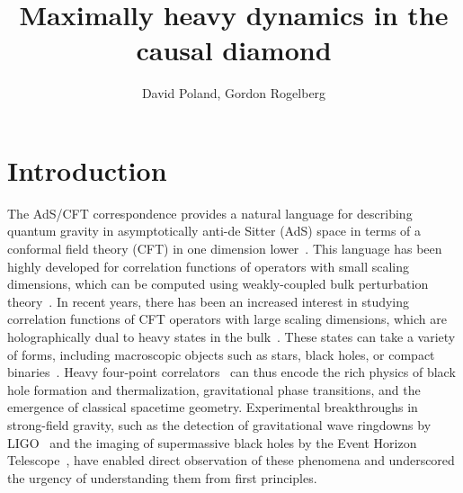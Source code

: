 \documentclass[a4paper,11pt]{article}
\title{Maximally heavy dynamics in the causal diamond}
\author{David Poland, Gordon Rogelberg}
\affiliation{Department of Physics, Yale University, 217 Prospect St, New Haven, CT 06520, USA}
\theoremstyle{plain}
\theoremstyle{definition}
\theoremstyle{remark}
\begin{document}
\maketitle

\setcounter{page}{2}
\newpage
{}
\setcounter{page}{1}

\section{Introduction}

The AdS/CFT correspondence provides a natural language for describing quantum gravity in asymptotically anti-de Sitter (AdS) space in terms of a conformal field theory (CFT) in one dimension lower~\cite{Maldacena:1997re,Gubser:1998bc,Witten:1998qj}. This language has been highly developed for correlation functions of operators with small scaling dimensions, which can be computed using weakly-coupled bulk perturbation theory~\cite{Arutyunov:2003ad,Chicherin_2016,Chicherin:2018avq}. In recent years, there has been an increased interest in studying correlation functions of CFT operators with large scaling dimensions, which are holographically dual to heavy states in the bulk~\cite{Fitzpatrick:2015zha,Asplund:2014coa,Collier:2019weq}. These states can take a variety of forms, including macroscopic objects such as stars, black holes, or compact binaries~\cite{Horowitz:2000fm,Hoyos:2021uff,Abajian2023-xw}. Heavy four-point correlators~\cite{Kim2015-sg,Poland:2024hvb} can thus encode the rich physics of black hole formation and thermalization, gravitational phase transitions, and the emergence of classical spacetime geometry. Experimental breakthroughs in strong-field gravity, such as the detection of gravitational wave ringdowns by LIGO~\cite{LIGOScientific:2016aoc} and the imaging of supermassive black holes by the Event Horizon Telescope~\cite{EventHorizonTelescope:2019dse}, have enabled direct observation of these phenomena and underscored the urgency of understanding them from first principles. 
\end{document}

